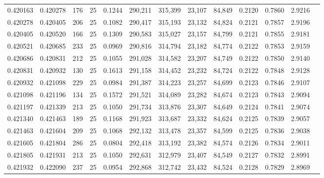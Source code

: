 \begin{tabular}{rrrrrrrrrrrrr}
0.420163 & 0.420278 &   176 &  25 &                                     0.1244 & 290,211 & 315,399 &  23,107 &  84,849 & 0.2120 & 0.7860 & 2.9216 \\
0.420278 & 0.420405 &   206 &  25 &                                     0.1082 & 290,417 & 315,193 &  23,132 &  84,824 & 0.2121 & 0.7857 & 2.9196 \\
0.420405 & 0.420520 &   166 &  25 &                                     0.1309 & 290,583 & 315,027 &  23,157 &  84,799 & 0.2121 & 0.7855 & 2.9181 \\
0.420521 & 0.420685 &   233 &  25 &                                     0.0969 & 290,816 & 314,794 &  23,182 &  84,774 & 0.2122 & 0.7853 & 2.9159 \\
0.420686 & 0.420831 &   212 &  25 &                                     0.1055 & 291,028 & 314,582 &  23,207 &  84,749 & 0.2122 & 0.7850 & 2.9140 \\
0.420831 & 0.420932 &   130 &  25 &                                     0.1613 & 291,158 & 314,452 &  23,232 &  84,724 & 0.2122 & 0.7848 & 2.9128 \\
0.420932 & 0.421098 &   229 &  25 &                                     0.0984 & 291,387 & 314,223 &  23,257 &  84,699 & 0.2123 & 0.7846 & 2.9107 \\
0.421098 & 0.421196 &   134 &  25 &                                     0.1572 & 291,521 & 314,089 &  23,282 &  84,674 & 0.2123 & 0.7843 & 2.9094 \\
0.421197 & 0.421339 &   213 &  25 &                                     0.1050 & 291,734 & 313,876 &  23,307 &  84,649 & 0.2124 & 0.7841 & 2.9074 \\
0.421340 & 0.421463 &   189 &  25 &                                     0.1168 & 291,923 & 313,687 &  23,332 &  84,624 & 0.2125 & 0.7839 & 2.9057 \\
0.421463 & 0.421604 &   209 &  25 &                                     0.1068 & 292,132 & 313,478 &  23,357 &  84,599 & 0.2125 & 0.7836 & 2.9038 \\
0.421605 & 0.421804 &   286 &  25 &                                     0.0804 & 292,418 & 313,192 &  23,382 &  84,574 & 0.2126 & 0.7834 & 2.9011 \\
0.421805 & 0.421931 &   213 &  25 &                                     0.1050 & 292,631 & 312,979 &  23,407 &  84,549 & 0.2127 & 0.7832 & 2.8991 \\
0.421932 & 0.422090 &   237 &  25 &                                     0.0954 & 292,868 & 312,742 &  23,432 &  84,524 & 0.2128 & 0.7829 & 2.8969 \\

\end{tabular}
